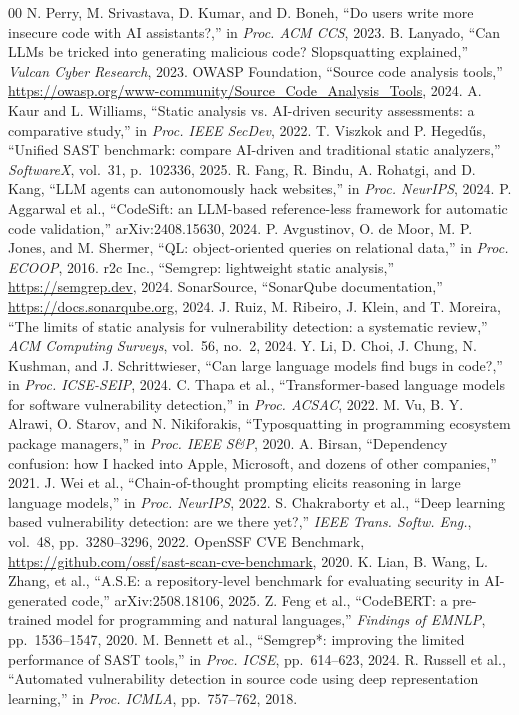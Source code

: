 \documentclass[conference]{IEEEtran}
\begin{document}
\begin{thebibliography}{00}
 N. Perry, M. Srivastava, D. Kumar, and D. Boneh, ``Do users write more insecure code with AI assistants?,'' in \textit{Proc. ACM CCS}, 2023.
 B. Lanyado, ``Can LLMs be tricked into generating malicious code? Slopsquatting explained,'' \textit{Vulcan Cyber Research}, 2023.
 OWASP Foundation, ``Source code analysis tools,'' \url{https://owasp.org/www-community/Source_Code_Analysis_Tools}, 2024.
 A. Kaur and L. Williams, ``Static analysis vs. AI-driven security assessments: a comparative study,'' in \textit{Proc. IEEE SecDev}, 2022.
 T. Viszkok and P. Heged\H{u}s, ``Unified SAST benchmark: compare AI-driven and traditional static analyzers,'' \textit{SoftwareX}, vol.~31, p.~102336, 2025.
 R. Fang, R. Bindu, A. Rohatgi, and D. Kang, ``LLM agents can autonomously hack websites,'' in \textit{Proc. NeurIPS}, 2024.
 P. Aggarwal et al., ``CodeSift: an LLM-based reference-less framework for automatic code validation,'' arXiv:2408.15630, 2024.
 P. Avgustinov, O. de Moor, M. P. Jones, and M. Shermer, ``QL: object-oriented queries on relational data,'' in \textit{Proc. ECOOP}, 2016.
 r2c Inc., ``Semgrep: lightweight static analysis,'' \url{https://semgrep.dev}, 2024.
 SonarSource, ``SonarQube documentation,'' \url{https://docs.sonarqube.org}, 2024.
 J. Ruiz, M. Ribeiro, J. Klein, and T. Moreira, ``The limits of static analysis for vulnerability detection: a systematic review,'' \textit{ACM Computing Surveys}, vol.~56, no.~2, 2024.
 Y. Li, D. Choi, J. Chung, N. Kushman, and J. Schrittwieser, ``Can large language models find bugs in code?,'' in \textit{Proc. ICSE-SEIP}, 2024.
 C. Thapa et al., ``Transformer-based language models for software vulnerability detection,'' in \textit{Proc. ACSAC}, 2022.
 M. Vu, B. Y. Alrawi, O. Starov, and N. Nikiforakis, ``Typosquatting in programming ecosystem package managers,'' in \textit{Proc. IEEE S\&P}, 2020.
 A. Birsan, ``Dependency confusion: how I hacked into Apple, Microsoft, and dozens of other companies,'' 2021.
 J. Wei et al., ``Chain-of-thought prompting elicits reasoning in large language models,'' in \textit{Proc. NeurIPS}, 2022.
 S. Chakraborty et al., ``Deep learning based vulnerability detection: are we there yet?,'' \textit{IEEE Trans. Softw. Eng.}, vol.~48, pp.~3280--3296, 2022.
 OpenSSF CVE Benchmark, \url{https://github.com/ossf/sast-scan-cve-benchmark}, 2020.
 K. Lian, B. Wang, L. Zhang, et al., ``A.S.E: a repository-level benchmark for evaluating security in AI-generated code,'' arXiv:2508.18106, 2025.
 Z. Feng et al., ``CodeBERT: a pre-trained model for programming and natural languages,'' \textit{Findings of EMNLP}, pp.~1536--1547, 2020.
 M. Bennett et al., ``Semgrep*: improving the limited performance of SAST tools,'' in \textit{Proc. ICSE}, pp.~614--623, 2024.
 R. Russell et al., ``Automated vulnerability detection in source code using deep representation learning,'' in \textit{Proc. ICMLA}, pp.~757--762, 2018.
\end{thebibliography}
\end{document}
